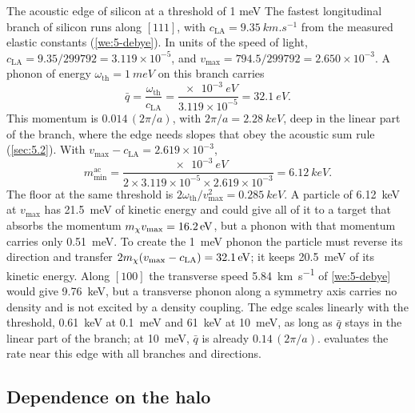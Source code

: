 \begin{workedexample}{The acoustic edge of silicon at a threshold of 1 meV}\label{we:9-acoustic}
The fastest longitudinal branch of silicon runs along $[111]$, with $c_{\mathrm{LA}} = \SI{9.35}{km.s^{-1}}$ from the measured elastic constants (\cref{we:5-debye}). In units of the speed of light, $c_{\mathrm{LA}} = 9.35/299792 = 3.119\times10^{-5}$, and $v_{\mathrm{max}} = 794.5/299792 = 2.650\times10^{-3}$. A phonon of energy $\omega_{\mathrm{th}} = \SI{1}{meV}$ on this branch carries
\begin{equation*}
  \bar q = \frac{\omega_{\mathrm{th}}}{c_{\mathrm{LA}}} = \frac{\SI{e-3}{eV}}{3.119\times10^{-5}} = \SI{32.1}{eV} .
\end{equation*}
This momentum is $0.014\,(2\pi/a)$, with $2\pi/a = \SI{2.28}{keV}$, deep in the linear part of the branch, where the edge needs slopes that obey the acoustic sum rule (\cref{sec:5.2}). With $v_{\mathrm{max}} - c_{\mathrm{LA}} = 2.619\times10^{-3}$,
\begin{equation*}
  m_{\mathrm{min}}^{\mathrm{ac}} = \frac{\SI{e-3}{eV}}{2 \times 3.119\times10^{-5} \times 2.619\times10^{-3}} = \SI{6.12}{keV} .
\end{equation*}
The floor at the same threshold is $2\omega_{\mathrm{th}}/v_{\mathrm{max}}^2 = \SI{0.285}{keV}$. A particle of \SI{6.12}{keV} at $v_{\mathrm{max}}$ has \SI{21.5}{meV} of kinetic energy and could give all of it to a target that absorbs the momentum $m_{\chi} v_{\mathrm{max}} = \SI{16.2}{eV}$, but a phonon with that momentum carries only \SI{0.51}{meV}. To create the \SI{1}{meV} phonon the particle must reverse its direction and transfer $2m_{\chi}(v_{\mathrm{max}} - c_{\mathrm{LA}}) = \SI{32.1}{eV}$; it keeps \SI{20.5}{meV} of its kinetic energy. Along $[100]$ the transverse speed \SI{5.84}{km.s^{-1}} of \cref{we:5-debye} would give \SI{9.76}{keV}, but a transverse phonon along a symmetry axis carries no density and is not excited by a density coupling. The edge scales linearly with the threshold, \SI{0.61}{keV} at \SI{0.1}{meV} and \SI{61}{keV} at \SI{10}{meV}, as long as $\bar q$ stays in the linear part of the branch; at \SI{10}{meV}, $\bar q$ is already $0.14\,(2\pi/a)$.  evaluates the rate near this edge with all branches and directions.
\end{workedexample}

\subsection{Dependence on the halo}\label{sec:9.2-halo}

